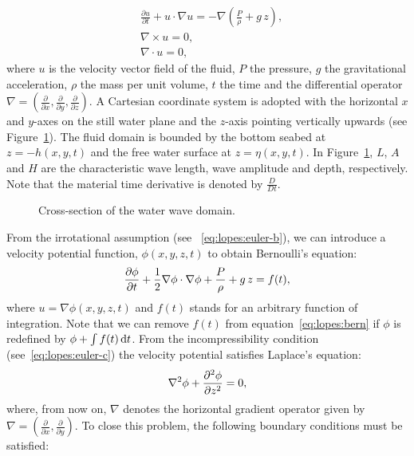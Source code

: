 \begin{subequations}\label{eq:lopes:euler}
\begin{align}
&\displaystyle\frac{\partial u}{\partial t}+ u \cdot \nabla
  u=-\nabla\left(\frac{P}{\rho} +g\,
  z\right),\label{eq:lopes:euler-a} \\ &\nabla\times
  u={0},\label{eq:lopes:euler-b}
  \\ &\nabla\cdot{u}=0,\label{eq:lopes:euler-c}
\end{align}
\end{subequations}
where $u$ is the velocity vector field of the fluid, $P$ the pressure,
$g$ the gravitational acceleration, $\rho$ the mass per unit volume,
$t$ the time and the differential operator
$\nabla=\left(\frac{\partial }{\partial x},\frac{\partial }{\partial
y},\frac{\partial }{\partial z}\right).$ A Cartesian coordinate system
is adopted with the horizontal $x$ and $y$-axes on the still water
plane and the $z$-axis pointing vertically upwards (see
Figure~\ref{fig:lopes:schematic}).  The fluid domain is bounded by the
bottom seabed at $z=-h(x,y,t)$ and the free water surface at
$z=\eta(x,y,t)$.  In Figure~\ref{fig:lopes:schematic}, $L$, $A$ and
$H$ are the characteristic wave length, wave amplitude and depth,
respectively. Note that the material time derivative is denoted by
$\frac{D}{D t}$.

\begin{figure}
\bwfig
  \centering
  \caption{Cross-section of the water wave domain.}
  \label{fig:lopes:schematic}
\end{figure}

From the irrotational assumption (see ~\eqref{eq:lopes:euler-b}), we
can introduce a velocity potential function,
$\phi(x,y,z,t)$ to obtain Bernoulli's equation:\vspace*{-4pt}
\begin{equation}
\label{eq:lopes:bern}
\frac{\partial \phi}{\partial t}+\frac{1}{2}\nabla \phi \cdot\nabla
\phi + \frac{P}{\rho} +g\, z=f(t),\vspace*{-4pt}
\end{equation}
where $u=\nabla\phi(x,y,z,t)$ and $f(t)$ stands for an arbitrary
function of integration.  Note that we can remove $f(t)$ from
equation~\eqref{eq:lopes:bern} if $\phi$ is redefined by $\phi+\int
f(t) \, \mathrm{d}t$.  From the incompressibility condition
(see~\eqref{eq:lopes:euler-c}) the velocity potential satisfies
Laplace's equation:\vspace*{-4pt}
\begin{equation}
  \label{eq:lopes:lap}
  \nabla^2\phi+\frac{\partial^2\phi}{\partial z^2}=0,\vspace*{-4pt}
\end{equation}
where, from now on, $\nabla$ denotes the horizontal gradient operator
given by $\nabla=\left(\frac{\partial }{\partial
    x},\frac{\partial}{\partial y}\right)\!\!.$ To close this problem,
the following boundary conditions must be satisfied:


